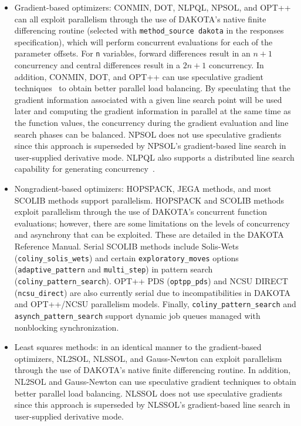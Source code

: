 \begin{itemize}
\item Gradient-based optimizers: CONMIN, DOT, NLPQL, NPSOL, and OPT++
  can all exploit parallelism through the use of DAKOTA's native finite
  differencing routine (selected with \texttt{method\_source dakota}
  in the responses specification), which will perform concurrent
  evaluations for each of the parameter offsets. For \texttt{n}
  variables, forward differences result in an $n+1$ concurrency and
  central differences result in a $2n+1$ concurrency. In addition,
  CONMIN, DOT, and OPT++ can use speculative gradient
  techniques~\cite{Byr88} to obtain better parallel load balancing. By
  speculating that the gradient information associated with a given
  line search point will be used later and computing the gradient
  information in parallel at the same time as the function values, the
  concurrency during the gradient evaluation and line search phases
  can be balanced. NPSOL does not use speculative gradients since this
  approach is superseded by NPSOL's gradient-based line search in
  user-supplied derivative mode.  NLPQL also supports a distributed
  line search capability for generating concurrency~\cite{Sch04}.

\item Nongradient-based optimizers: HOPSPACK, JEGA methods, and most
  SCOLIB methods support parallelism.  HOPSPACK and SCOLIB methods
  exploit parallelism through the use of DAKOTA's concurrent function
  evaluations; however, there are some limitations on the levels of
  concurrency and asynchrony that can be exploited.  These are detailed
  in the DAKOTA Reference Manual. Serial SCOLIB methods include
  Solis-Wets (\texttt{coliny\_solis\_wets}) and certain
  \texttt{exploratory\_moves} options (\texttt{adaptive\_pattern} and
  \texttt{multi\_step}) in pattern search
  (\texttt{coliny\_pattern\_search}).  OPT++ PDS (\texttt{optpp\_pds})
  and NCSU DIRECT (\texttt{ncsu\_direct}) are also currently serial
  due to incompatibilities in DAKOTA and OPT++/NCSU parallelism
  models.  Finally, \texttt{coliny\_pattern\_search} and
  \texttt{asynch\_pattern\_search} support dynamic job queues managed
  with nonblocking synchronization.

\item Least squares methods: in an identical manner to the
  gradient-based optimizers, NL2SOL, NLSSOL, and Gauss-Newton can
  exploit parallelism through the use of DAKOTA's native finite
  differencing routine. In addition, NL2SOL and Gauss-Newton can use
  speculative gradient techniques to obtain better parallel load
  balancing. NLSSOL does not use speculative gradients since this
  approach is superseded by NLSSOL's gradient-based line search in
  user-supplied derivative mode.


\end{itemize}
